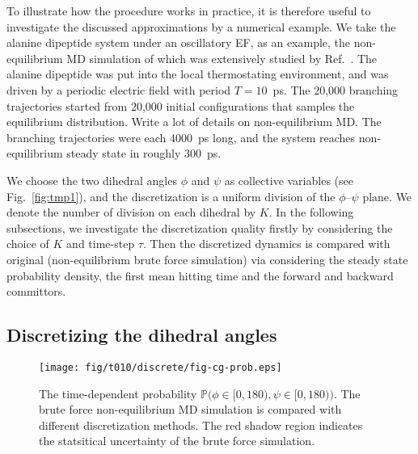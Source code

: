 \documentclass[aps, pre, preprint,unsortedaddress,a4paper,onecolumn]{revtex4}
\newcommand{\redc}[1]{{\color{red} #1}}
\begin{document}
To illustrate how the procedure works in practice, it is therefore
useful to investigate the discussed approximations by a numerical
example.  We take the alanine dipeptide system under an oscillatory EF,
as an example, the non-equilibrium MD simulation of which was
extensively studied by Ref.~\cite{wang2014exploring}.  
The alanine dipeptide was put into the local thermostating
environment, and was driven by a periodic electric field with period
$T = 10$~ps. The 20,000 branching trajectories started from 20,000
initial configurations that samples the equilibrium distribution.
\redc{Write a lot of details on non-equilibrium MD.}  The branching
trajectories were each 4000~ps long, and the system reaches
non-equilibrium steady state in roughly 300~ps.

We choose the
two dihedral angles $\phi$ and $\psi$ as collective variables (see
Fig.~\ref{fig:tmp1}), and the discretization is a uniform division of
the $\phi$--$\psi$ plane. We denote the number of division on each
dihedral by $K$. In the following subsections, we investigate the discretization
quality firstly by considering the choice of $K$ and time-step $\tau$. Then
the discretized dynamics is compared with original (non-equilibrium brute force simulation)
via considering the steady state probability density, the first mean hitting time
and the forward and backward committors.


\subsection{Discretizing the dihedral angles}
\begin{figure}
  \centering
  \texttt{[image: fig/t010/discrete/fig-cg-prob.eps]}  
  \caption{The time-dependent probability $\mathbb
    P\big(\phi\in[0,180), \psi\in [0,180)\big)$.  The brute force
    non-equilibrium MD simulation is compared with different
    discretization methods. The red shadow region indicates the
    statsitical uncertainty of the brute force simulation.}
  \label{fig:tmp2}
\end{figure}
\end{document}
